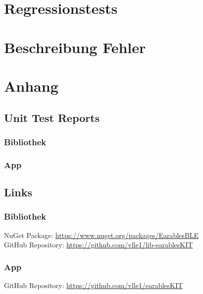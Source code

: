\documentclass[a4paper,12pt]{article}
\begin{document}
\section{Regressionstests}

\section{Beschreibung Fehler}

\section{Anhang}
\subsection{Unit Test Reports}
\subsubsection{Bibliothek}
\subsubsection{App}

\subsection{Links}
\subsubsection{Bibliothek}
NuGet Package: \url{https://www.nuget.org/packages/EarablesBLE}\\
GitHub Repository: \url{https://github.com/vlle1/lib-earablesKIT}
\subsubsection{App}
GitHub Repository: \url{https://github.com/vlle1/earablesKIT}


\printglossaries
{}
\end{document}
